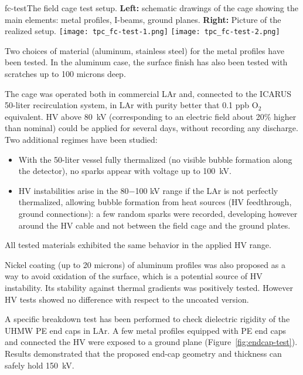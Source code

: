 \begin{cdrfigure}{fc-test}{The field cage test setup. 
 {\bf Left:} schematic drawings of the cage showing the main elements: metal profiles, I-beams, ground planes.
  {\bf Right:} Picture of the realized setup.}
\texttt{[image: tpc\_fc-test-1.png]}
\texttt{[image: tpc\_fc-test-2.png]}
\end{cdrfigure}

Two choices of material (aluminum, stainless steel) for the metal profiles have been tested. In the aluminum case, the surface finish has also been tested with scratches up to 100 microns deep. 

The cage was operated both in commercial LAr and, connected to the ICARUS 50-liter recirculation system, in LAr with purity  better that 0.1 ppb O$_2$ equivalent. HV above 80~kV (corresponding to an electric field about 20\% higher than nominal) could be 
 applied for several days, without recording any discharge. Two additional regimes have been studied:
\begin{itemize}	
\item  With the 50-liter vessel fully thermalized (no visible bubble formation along the detector), no sparks appear %
with voltage up to 100~kV.
\item  HV instabilities arise in the 80$-$100 kV range if the LAr is not perfectly thermalized, allowing bubble formation from heat sources (HV feedthrough, ground connections): a few random sparks were recorded, developing however around the HV cable and not between the field cage and the ground plates.
\end{itemize}

All tested materials exhibited the same behavior in the applied HV range. 

Nickel coating (up to 20 microns) of aluminum profiles was also proposed as a way to avoid oxidation of the surface, which %
is a potential source of HV instability. Its stability against  thermal gradients was positively tested.  However HV tests showed no difference with respect to the uncoated version.

A specific breakdown test has been performed to check dielectric rigidity of the UHMW PE end caps in LAr. %
A few metal profiles equipped with PE end caps and connected the HV were exposed to a ground plane (Figure~\ref{fig:endcap-test}).
Results demonstrated that the proposed end-cap geometry and thickness can safely hold 150~kV.

